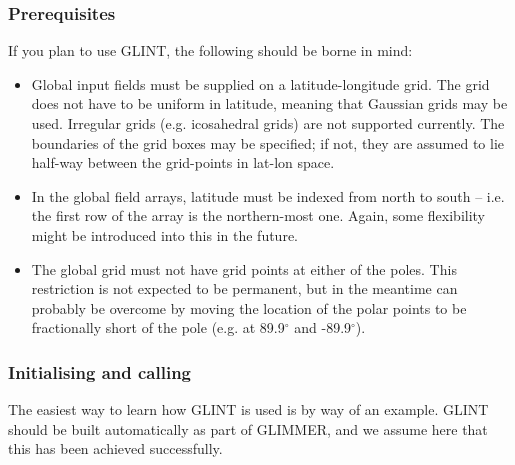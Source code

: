 \subsubsection{Prerequisites}
%
If you plan to use GLINT, the following should be borne in mind:
%
\begin{itemize}
\item Global input fields must be supplied on a latitude-longitude
  grid. The grid does not have to be uniform in latitude, meaning that
  Gaussian grids may be used. Irregular grids (e.g. icosahedral grids) are not
  supported currently. The boundaries of the grid boxes may be specified; if
  not, they are assumed to lie half-way between the grid-points in lat-lon space.
\item In the global field arrays, latitude must be indexed from north to south
  -- i.e. the first row of the array is the northern-most one. Again, some
  flexibility might be introduced into this in the future.
\item The global grid must not have grid points at either of the
  poles. This restriction is not expected to be permanent, but in the meantime
  can probably be overcome by moving the location of the polar points to be
  fractionally short of the pole (e.g. at 89.9$^{\circ}$ and -89.9$^{\circ}$).
\end{itemize}
%
\subsubsection{Initialising and calling}

The easiest way to learn how GLINT is used is by way of an
example. GLINT should be built automatically as part of GLIMMER, and we assume
here that this has been achieved successfully.

